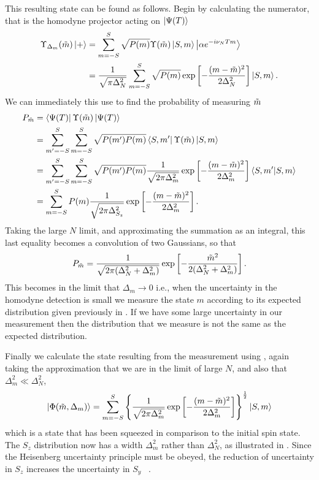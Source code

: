 This resulting state can be found as follows. Begin by calculating the
numerator, that is the homodyne projector acting on $\ket{\Psi(T)}$
%
\begin{align}
  \Upsilon_{\Delta_m}(\tilde{m})\ket{+} &=
  \sum_{m=-S}^{S}\sqrt{P(m)}\Upsilon(\tilde{m})\ket{S,m}\ket{\alpha e^{-i\nu_N
  Tm}} \\
  &=\frac{1}{\sqrt{\pi\Delta_N^2}}\sum_{m=-S}^S \sqrt{P(m)} \exp\left[
    -\frac{(m-\tilde{m})^2}{2\Delta_N^2}\right]\ket{S,m}.
\end{align}
%
We can immediately this use to find the probability of measuring $\tilde{m}$
%
\begin{align}
  P_{\tilde{m}} &= \bra{\Psi(T)}\Upsilon(\tilde{m})\ket{\Psi(T)}\\
  & = \sum_{m'=-S}^S \sum_{m=-S}^S \sqrt{P(m')P(m)}\bra{S,
  m'}\Upsilon(\tilde{m})\ket{S, m} \\
  & = \sum_{m'=-S}^S \sum_{m=-S}^S \sqrt{P(m')P(m)}
  \frac{1}{\sqrt{2\pi\Delta_m^2}}\exp\left[-\frac{(m-\tilde{m})^2}{2\Delta_m^2}\right] 
  \bra{S, m'}\ket{S, m} \\
  &= \sum_{m=-S}^{S} P(m) 
  \frac{1}{\sqrt{2\pi\Delta_{S_z}^2}}\exp\left[-\frac{(m-\tilde{m})^2}{2\Delta_m^2}\right] .
\end{align}
%
Taking the large $N$ limit, and approximating the summation as an integral,
this last equality becomes a convolution of two Gaussians, so that
%
\begin{equation}
  P_{\tilde{m}} = \frac{1}{\sqrt{2\pi(\Delta_N^2 + \Delta_m^2)}}\exp\left[
    -\frac{\tilde{m}^2}{2(\Delta_N^2 + \Delta_m^2)}\right].
\end{equation}
%
This becomes  in the limit that $\Delta_m \to 0$
i.e., when the uncertainty in the homodyne detection is small we measure the
state $m$ according to its expected distribution given previously in
. If we have some large uncertainty in our
measurement then the distribution that we measure is not the same as the
expected distribution.

Finally we calculate the state resulting from the measurement using
, again taking the
approximation that we are in the limit of large $N$, and also that
$\Delta_m^2 \ll \Delta_N^2$,
%
\begin{equation}
  \ket{\Phi(\tilde{m}, \Delta_m)} =
  \sum_{m=-S}^S\left\{\frac{1}{\sqrt{2\pi\Delta_m^2}} \exp\left[-\frac{(m -
  \tilde{m})^2}{2\Delta_m^2}\right]\right\}^\frac{1}{2} \ket{S,m}
\end{equation}
%
which is a state that has been squeezed in comparison to the initial spin
state. The $S_z$ distribution now has a width $\Delta_m^2$ rather than
$\Delta_N^2$, as illustrated in . Since the
Heisenberg uncertainty principle must be obeyed, the reduction of uncertainty
in $S_z$ increases the uncertainty in $S_y$ ~\cite{PhysRevA.47.3554}.


